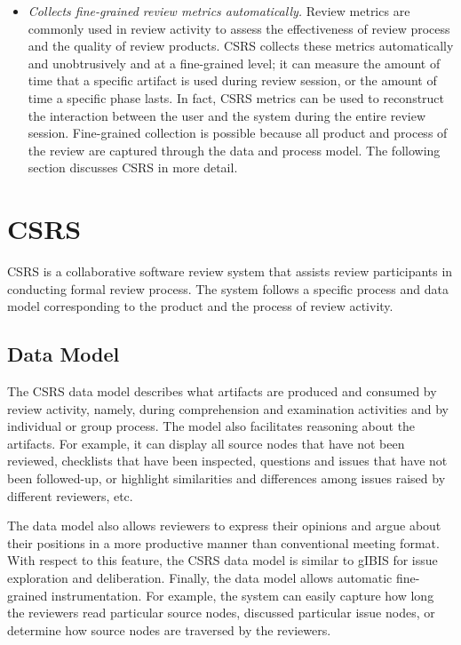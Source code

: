 \begin {itemize}
Finally, when comparing different review methods using this framework,
one should also consider the differences in computational supports
used in each of the review activities above. In CSRS, these levels of
support can be enacted and controlled through the data and the process
model.

\item {\sl Collects fine-grained review metrics automatically.} 
Review metrics are commonly used in review activity to assess the
effectiveness of review process and the quality of review products.
CSRS collects these metrics automatically and unobtrusively and at a
fine-grained level; it can measure the amount of time that a specific
artifact is used during review session, or the amount of time a
specific phase lasts.  In fact, CSRS metrics can be used to
reconstruct the interaction between the user and the system during the
entire review session.  Fine-grained collection is possible because
all product and process of the review are captured through the data
and process model. The following section discusses CSRS in more
detail.
  
\end{itemize}

\section {CSRS}

CSRS is a collaborative software review system that assists review
participants in conducting formal review process. The system follows
a specific process and data model corresponding to the product and the
process of review activity.

\subsection {Data Model}
The CSRS data model describes what artifacts are produced and consumed
by review activity, namely, during comprehension and examination
activities and by individual or group process.  The model also
facilitates reasoning about the artifacts.  For example, it can
display all source nodes that have not been reviewed, checklists that
have been inspected, questions and issues that have not been
followed-up, or highlight similarities and differences among issues
raised by different reviewers, etc.

The data model also allows reviewers to express their opinions and
argue about their positions in a more productive manner than
conventional meeting format. With respect to this feature, the CSRS
data model is similar to gIBIS\cite{Conklin88} for issue exploration
and deliberation.  Finally, the data model allows automatic
fine-grained instrumentation. For example, the system can easily
capture how long the reviewers read particular source nodes, discussed
particular issue nodes, or determine how source nodes are traversed by
the reviewers.

